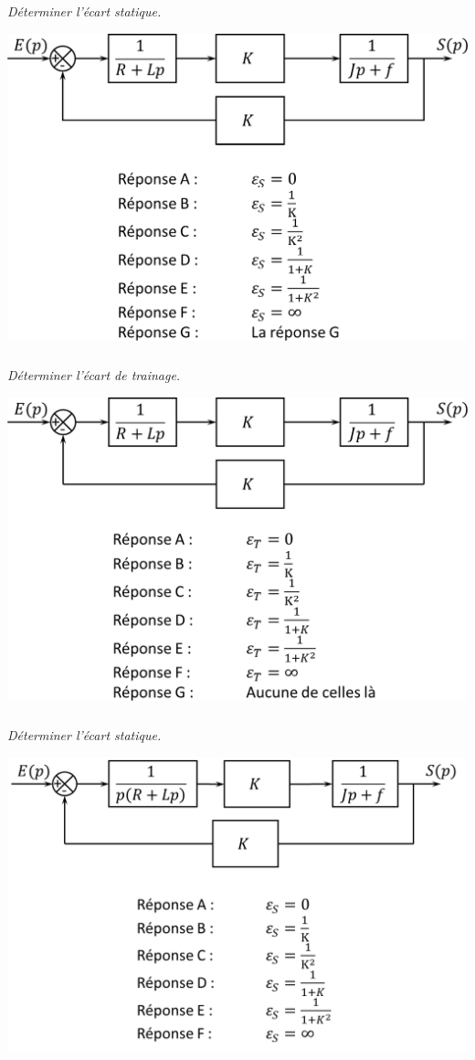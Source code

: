 \documentclass[10pt,fleqn]{article} %
\begin{document}
\begin{multicols}{2}
\subparagraph{}\textit{Déterminer l'écart statique.}
\begin{center}
\includegraphics[width=\linewidth]{03}
\end{center}

\subparagraph{}\textit{Déterminer l'écart de trainage.}
\begin{center}
\includegraphics[width=\linewidth]{04}
\end{center}

\subparagraph{}\textit{Déterminer l'écart statique.}
\begin{center}
\includegraphics[width=\linewidth]{05}
\end{center}


\end{multicols}
\end{document}
